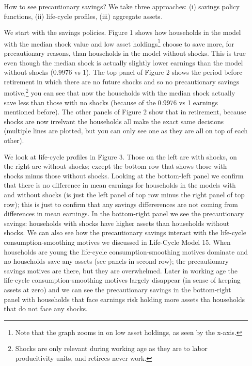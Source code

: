 How to see precautionary savings? We take three approaches: (i) savings policy functions, (ii) life-cycle profiles, (iii) aggregate assets.

We start with the savings policies. Figure 1 shows how households in the model with the median shock value and low asset holdings\footnote{Note that the graph zooms in on low asset holdings, as seen by the x-axis.} choose to save more, for precautionary reasons, than households in the model without shocks. This is true even though the median shock is actually slightly lower earnings than the model without shocks (0.9976 vs 1). The top panel of Figure 2 shows the period before retirement in which there are no future shocks and so no precautionary savings motive,\footnote{Shocks are only relevant during working age as they are to labor producitivity units, and retirees never work.} you can see that now the households with the median shock actually save less than those with no shocks (because of the 0.9976 vs 1 earnings mentioned before). The other panels of Figure 2 show that in retirement, because shocks are now irrelvant the households all make the exact same decisions (multiple lines are plotted, but you can only see one as they are all on top of each other).

We look at life-cycle profiles in Figure 3. Those on the left are with shocks, on the right are without shocks; except the bottom row that shows those with shocks minus those without shocks. Looking at the bottom-left panel we confirm that there is no difference in mean earnings for households in the models with and without shocks (is just the left panel of top row minus the right panel of top row); this is just to confirm that any savings differerences are not coming from differences in mean earnings. In the bottom-right panel we see the precautionary savings: households with shocks have higher assets than households without shocks. We can also see how the precautionary savings interact with the life-cycle consumption-smoothing motives we discussed in Life-Cycle Model 15. When households are young the life-cycle consumption-smoothing motives dominate and no households save any assets (see panels in second row); the precautionary savings motives are there, but they are overwhelmed. Later in working age the life-cycle consumption-smoothing motives largely disappear (in sense of keeping assets at zero) and we can see the precautionary savings in the bottom-right panel with households that face earnings risk holding more assets tha households that do not face any shocks.

